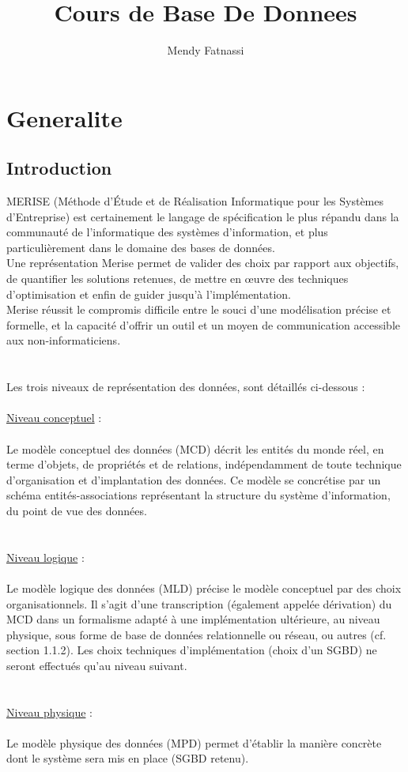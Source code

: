 \documentclass[a4paper,12pt,openany]{book}
\author{Mendy Fatnassi}
\title{Cours de Base De Donnees}
\begin{document}
\maketitle
\tableofcontents

\chapter{Generalite}
\section{Introduction}
MERISE (Méthode d'Étude et de Réalisation Informatique pour les Systèmes d'Entreprise) est certainement le langage de spécification le plus répandu dans la communauté de l'informatique des systèmes d'information, et plus particulièrement dans le domaine des bases de données. \\
Une représentation Merise permet de valider des choix par rapport aux objectifs, de quantifier les solutions retenues, de mettre en œuvre des techniques d'optimisation et enfin de guider jusqu'à l'implémentation.\\
Merise réussit le compromis difficile entre le souci d'une modélisation précise et formelle, et la capacité d'offrir un outil et un moyen de communication accessible aux non-informaticiens.\\
\\
\\
Les trois niveaux de représentation des données, sont détaillés ci-dessous :\\
\\
\underline{Niveau conceptuel} :\\
\\
Le modèle conceptuel des données (MCD) décrit les entités du monde réel, en terme d'objets, de propriétés et de relations, indépendamment de toute technique d'organisation et d'implantation des données. Ce modèle se concrétise par un schéma entités-associations représentant la structure du système d'information, du point de vue des données.\\
\\
\\
\underline{Niveau logique} : \\
\\
Le modèle logique des données (MLD) précise le modèle conceptuel par des choix organisationnels. Il s'agit d'une transcription (également appelée dérivation) du MCD dans un formalisme adapté à une implémentation ultérieure, au niveau physique, sous forme de base de données relationnelle ou réseau, ou autres (cf. section 1.1.2). Les choix techniques d'implémentation (choix d'un SGBD) ne seront effectués qu'au niveau suivant.\\
\\
\\
\underline{Niveau physique} :\\
\\
Le modèle physique des données (MPD) permet d'établir la manière concrète dont le système sera mis en place (SGBD retenu).\\
\end{document}
